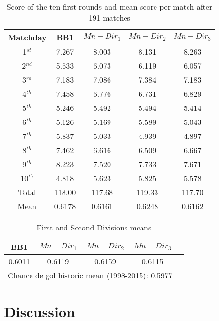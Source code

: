 \documentclass[journal,article,accept,moreauthors,pdftex,12pt,a4paper]{mdpi}
\begin{document}
\begin{table}[h]
\begin{center}
\begin{tabular}{ccccc}

\hline
Matchday & BB1 & $Mn-Dir_1$ & $Mn-Dir_2$ & $Mn-Dir_3$\\
\hline
\hline
1$^{st}$ & 7.267 & 8.003 & 8.131 & 8.263 \\
2$^{nd}$ & 5.633 & 6.073 & 6.119 & 6.057 \\
3$^{rd}$ & 7.183 & 7.086 & 7.384 & 7.183 \\
4$^{th}$ & 7.458 & 6.776 & 6.731 & 6.829 \\
5$^{th}$ & 5.246 & 5.492 & 5.494 & 5.414 \\
6$^{th}$ & 5.126 & 5.169 & 5.589 & 5.043 \\
7$^{th}$ & 5.837 & 5.033 & 4.939 & 4.897 \\
8$^{th}$ & 7.462 & 6.616 & 6.509 & 6.667 \\
9$^{th}$ & 8.223 & 7.520 & 7.733 & 7.671 \\
10$^{th}$ & 4.818 & 5.623 & 5.825 & 5.578 \\
\hline
Total & 118.00 & 117.68 & 119.33 & 117.70 \\
\hline
Mean & 0.6178 & 0.6161 & 0.6248 & 0.6162 \\

\hline
\end{tabular}
\caption{Score of the ten first rounds and mean score per match after 191 matches}
\end{center}
\end{table}


\begin{table}[h]
\begin{center}
\begin{tabular}{ccccc}

\hline
BB1 & $Mn-Dir_1$ & $Mn-Dir_2$ & $Mn-Dir_3$\\
\hline
\hline
0.6011 & 0.6119 & 0.6159 & 0.6115\\
\hline
\multicolumn{4}{c}{Chance de gol historic mean (1998-2015): 0.5977}\\
\hline
\end{tabular}
\caption{First and Second Divisions means}
\end{center}
\end{table}

\section{Discussion}
\end{document}
